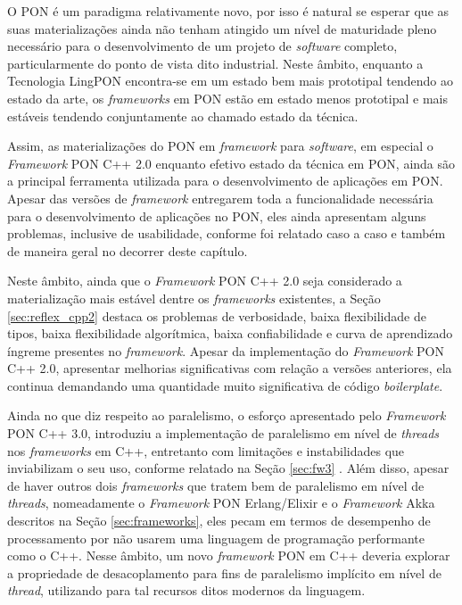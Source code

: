 O PON é um paradigma relativamente novo, por isso é natural se esperar que as
suas materializações ainda não tenham atingido um nível de maturidade pleno
necessário para o desenvolvimento de um projeto de \textit{software} completo,
particularmente do ponto de vista dito industrial. Neste âmbito, enquanto a
Tecnologia LingPON encontra-se em um estado bem mais prototipal tendendo ao
estado da arte, os \textit{frameworks} em PON estão em estado menos prototipal e
mais estáveis tendendo conjuntamente ao chamado estado da técnica. 

Assim, as materializações do PON em \textit{framework} para \textit{software},
em especial o \textit{Framework} PON C++ 2.0 enquanto efetivo estado da técnica
em PON, ainda são a principal ferramenta utilizada para o desenvolvimento de
aplicações em PON. Apesar das versões de \textit{framework} entregarem toda a
funcionalidade necessária para o desenvolvimento de aplicações no PON, eles
ainda apresentam alguns problemas, inclusive de usabilidade, conforme foi
relatado caso a caso e também de maneira geral no decorrer deste capítulo.

Neste âmbito, ainda que o \textit{Framework} PON C++ 2.0 seja considerado a
materialização mais estável dentre os \textit{frameworks} existentes, a Seção
\ref{sec:reflex_cpp2} destaca os problemas de verbosidade, baixa flexibilidade
de tipos, baixa flexibilidade algorítmica, baixa confiabilidade e curva de
aprendizado íngreme presentes no \textit{framework}. Apesar da implementação do
\textit{Framework} PON C++ 2.0, apresentar melhorias significativas com relação
a versões anteriores, ela continua demandando uma quantidade muito significativa
de código \textit{boilerplate}.

Ainda no que diz respeito ao paralelismo, o esforço apresentado pelo
\textit{Framework} PON C++ 3.0, introduziu a implementação de paralelismo em
nível de \textit{threads} nos \textit{frameworks} em C++, entretanto com
limitações e instabilidades que inviabilizam o seu uso, conforme relatado na
Seção \ref{sec:fw3} \cite{martini_2019}. Além disso, apesar de haver outros dois
\textit{frameworks} que tratem bem de paralelismo em nível de \textit{threads},
nomeadamente o \textit{Framework} PON Erlang/Elixir e o \textit{Framework} Akka
descritos na Seção \ref{sec:frameworks}, eles pecam em termos de desempenho de
processamento por não usarem uma linguagem de programação performante como o
C++. Nesse âmbito, um novo \textit{framework} PON em C++ deveria explorar a
propriedade de desacoplamento para fins de paralelismo implícito em nível de
\textit{thread}, utilizando para tal recursos ditos modernos da linguagem.

